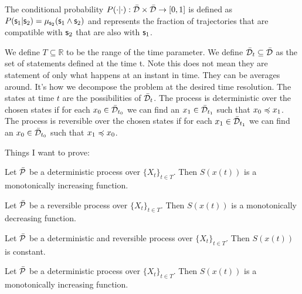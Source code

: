 \documentclass[letterpaper]{article}
\begin{document}
The conditional probability $P(\cdot | \cdot) : \tdomain \times \tdomain \to [0,1]$ is defined as $P(\stmt_1 | \stmt_2) = \mu_{\stmt_2}(\stmt_1 \AND \stmt_2)$ and represents the fraction of trajectories that are compatible with $\stmt_2$ that are also with $\stmt_1$.

We define $T \subseteq \mathbb{R}$ to be the range of the time parameter. We define $\tdomain_{t} \subseteq \tdomain$ as the set of statements defined at the time t. Note this does not mean they are statement of only what happens at an instant in time. They can be averages around. It's how we decompose the problem at the desired time resolution. The states at time $t$ are the possibilities of $\tdomain_t$. The process is deterministic over the chosen states if for each $x_0 \in \tdomain_{t_0}$ we can find an $x_1 \in \tdomain_{t_1}$ such that $x_0 \narrower x_1$.  The process is reversible over the chosen states if for each $x_1 \in \tdomain_{t_1}$ we can find an $x_0 \in \tdomain_{t_0}$ such that $x_1 \narrower x_0$.

Things I want to prove:

\begin{prop}
	Let $\tdomain[P]$ be a deterministic process over $\{X_t\}_{t \in T}$. Then $S(x(t))$ is a monotonically increasing function.
\end{prop}

\begin{prop}
	Let $\tdomain[P]$ be a reversible process over $\{X_t\}_{t \in T}$. Then $S(x(t))$ is a monotonically decreasing function.
\end{prop}

\begin{prop}
	Let $\tdomain[P]$ be a deterministic and reversible process over $\{X_t\}_{t \in T}$. Then $S(x(t))$ is constant.
\end{prop}

\begin{prop}
	Let $\tdomain[P]$ be a deterministic process over $\{X_t\}_{t \in T}$. Then $S(x(t))$ is a monotonically increasing function.
\end{prop}


\end{document}
